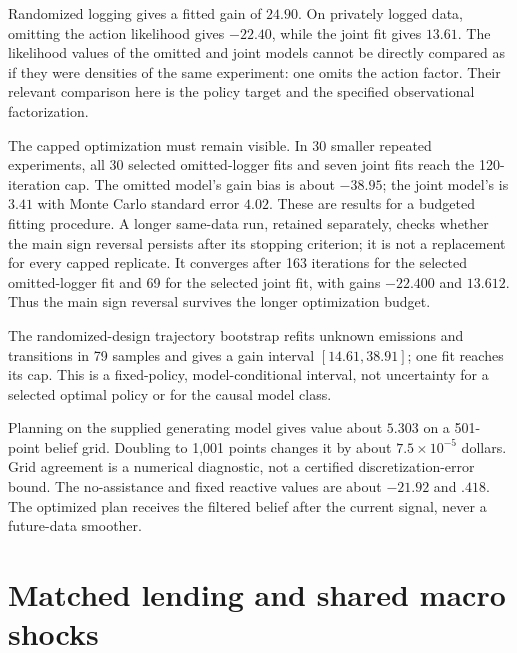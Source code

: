 \begin{table}[htbp]\centering\small

\caption{Fitted hidden-state models with unknown emissions. These are
model-conditional estimation comparisons, not a general identification
theorem for observational POMDPs.}
\end{table}

Randomized logging gives a fitted gain of $24.90$. On privately logged
data, omitting the action likelihood gives $-22.40$, while the joint
fit gives $13.61$. The likelihood values of the omitted and joint
models cannot be directly compared as if they were densities of the
same experiment: one omits the action factor. Their relevant comparison
here is the policy target and the specified observational factorization.

The capped optimization must remain visible. In 30 smaller repeated
experiments, all 30 selected omitted-logger fits and seven joint fits
reach the 120-iteration cap. The omitted model's gain bias is about
$-38.95$; the joint model's is $3.41$ with Monte Carlo standard error
$4.02$. These are results for a budgeted fitting procedure. A longer
same-data run, retained separately, checks whether the main sign
reversal persists after its stopping criterion; it is not a replacement
for every capped replicate.
It converges after 163 iterations for the selected omitted-logger fit
and 69 for the selected joint fit, with gains $-22.400$ and $13.612$.
Thus the main sign reversal survives the longer optimization budget.

The randomized-design trajectory bootstrap refits unknown emissions
and transitions in 79 samples and gives a gain interval
$[14.61,38.91]$; one fit reaches its cap. This is a fixed-policy,
model-conditional interval, not uncertainty for a selected optimal
policy or for the causal model class.

Planning on the supplied generating model gives value about $5.303$
on a 501-point belief grid. Doubling to 1,001 points changes it by
about $7.5\times10^{-5}$ dollars. Grid agreement is a numerical
diagnostic, not a certified discretization-error bound. The no-assistance
and fixed reactive values are about $-21.92$ and $.418$.
The optimized plan receives the filtered belief after the current
signal, never a future-data smoother.

\section{Matched lending and shared macro shocks}
\label{r3:credit-dependence-study}

